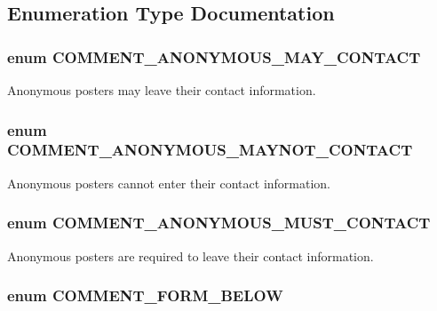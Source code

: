 \subsection{Enumeration Type Documentation}
\hypertarget{comment_8module_a4c2165b321b42d7a819a45338702d1f0}{
\subsubsection[{COMMENT\_\-ANONYMOUS\_\-MAY\_\-CONTACT}]{\setlength{\rightskip}{0pt plus 5cm}enum {\bf COMMENT\_\-ANONYMOUS\_\-MAY\_\-CONTACT}}}
\label{comment_8module_a4c2165b321b42d7a819a45338702d1f0}
Anonymous posters may leave their contact information. \hypertarget{comment_8module_a434cd95ddfa8fce4da883c5ced78dba4}{
\subsubsection[{COMMENT\_\-ANONYMOUS\_\-MAYNOT\_\-CONTACT}]{\setlength{\rightskip}{0pt plus 5cm}enum {\bf COMMENT\_\-ANONYMOUS\_\-MAYNOT\_\-CONTACT}}}
\label{comment_8module_a434cd95ddfa8fce4da883c5ced78dba4}
Anonymous posters cannot enter their contact information. \hypertarget{comment_8module_a41a3f08b14c97f4603e336ba7173deae}{
\subsubsection[{COMMENT\_\-ANONYMOUS\_\-MUST\_\-CONTACT}]{\setlength{\rightskip}{0pt plus 5cm}enum {\bf COMMENT\_\-ANONYMOUS\_\-MUST\_\-CONTACT}}}
\label{comment_8module_a41a3f08b14c97f4603e336ba7173deae}
Anonymous posters are required to leave their contact information. \hypertarget{comment_8module_a1d93fd4a39f5ec90008efb08cde55d45}{
\subsubsection[{COMMENT\_\-FORM\_\-BELOW}]{\setlength{\rightskip}{0pt plus 5cm}enum {\bf COMMENT\_\-FORM\_\-BELOW}}}
